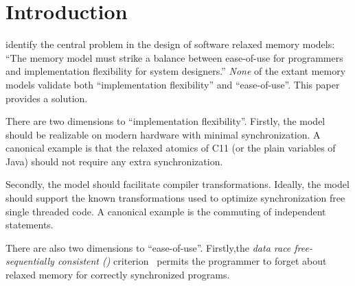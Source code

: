 \section{Introduction}
\label{sec:intro}
\citet{Manson:2005:JMM:1047659.1040336} identify the central problem in the design of software relaxed memory models: ``The memory model must strike a balance between ease-of-use for programmers and implementation flexibility for system designers.''   \emph{None} of the extant memory models validate both ``implementation flexibility'' and ``ease-of-use''.   This paper provides a solution.


There are two dimensions to ``implementation flexibility''.  Firstly, the model should be realizable on modern hardware with minimal synchronization.  A canonical example is that the relaxed atomics of C11 (or the plain variables of Java) should not require any extra synchronization.

Secondly, the  model should facilitate compiler transformations.    Ideally, the model should support the known transformations used to optimize  synchronization free single threaded code.  A canonical example is the  commuting of independent statements.


There are also two dimensions to ``ease-of-use''.  Firstly,the \emph{data race free-sequentially consistent (\drfsc)} criterion~\cite{DBLP:journals/tpds/AdveH93, DBLP:conf/isca/AdveH90} permits the programmer to forget about relaxed memory for correctly synchronized programs.

